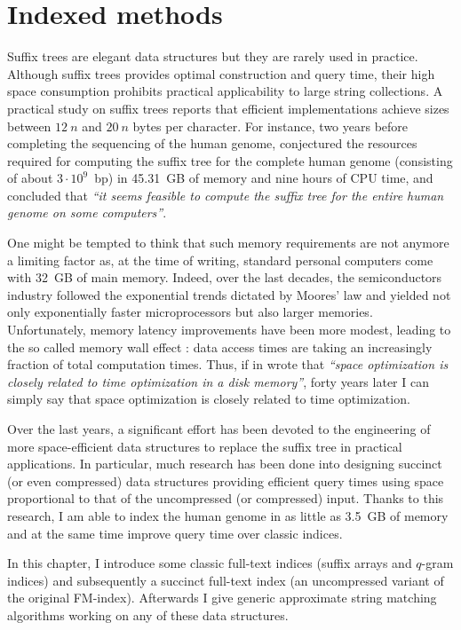 \chapter{Indexed methods}
\label{chr:index}

Suffix trees are elegant data structures but they are rarely used in practice.
Although suffix trees provides optimal construction and query time, their high space consumption prohibits practical applicability to large string collections.
A practical study on suffix trees \citep{Kurtz1999} reports that efficient implementations achieve sizes between $12~n$ and $20~n$ bytes per character.
For instance, two years before completing the sequencing of the human genome, \citeauthor{Kurtz1999} conjectured the resources required for computing the suffix tree for the complete human genome (consisting of about $3 \cdot 10^9$~bp) in 45.31~GB of memory and nine hours of CPU time, and concluded that \emph{``it seems feasible to compute the suffix tree for the entire human genome on some computers''}.

One might be tempted to think that such memory requirements are not anymore a limiting factor as, at the time of writing, standard personal computers come with 32~GB of main memory.
Indeed, over the last decades, the semiconductors industry followed the exponential trends dictated by Moores' law and yielded not only exponentially faster microprocessors but also larger memories.
Unfortunately, memory latency improvements have been more modest, leading to the so called memory wall effect \citep{Wilkes1995}: data access times are taking an increasingly fraction of total computation times.
Thus, if in \citeyear{Knuth1973} \citeauthor{Knuth1973} wrote that \emph{``space optimization is closely related to time optimization in a disk memory''}, forty years later I can simply say that space optimization is closely related to time optimization.

Over the last years, a significant effort has been devoted to the engineering of more space-efficient data structures to replace the suffix tree in practical applications.
In particular, much research has been done into designing succinct (or even compressed) data structures providing efficient query times using space proportional to that of the uncompressed (or compressed) input.
Thanks to this research, I am able to index the human genome in as little as 3.5~GB of memory and at the same time improve query time over classic indices.

In this chapter, I introduce some classic full-text indices (suffix arrays and $q$-gram indices) and subsequently a succinct full-text index (an uncompressed variant of the original FM-index).
Afterwards I give generic approximate string matching algorithms working on any of these data structures.

